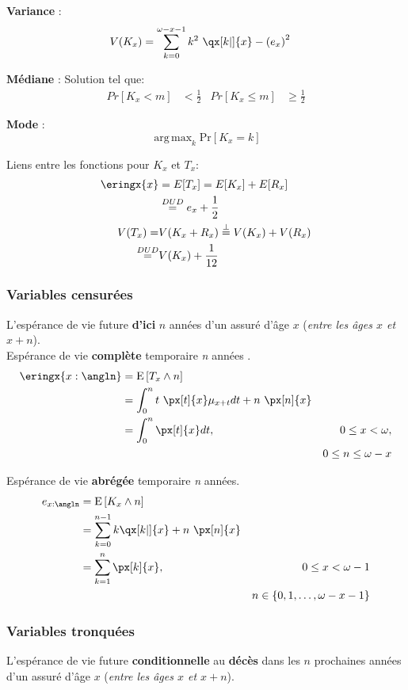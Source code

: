 \documentclass[10pt, french]{article}
\DeclareMathOperator*{\argmax}{arg\,max}
\begin{document}
\begin{multicols*}{3}
\textbf{Variance} :  
	\begin{align*}
		V(K_x) &= 
		\sum_{k = 0}^{\omega - x - 1} k^2 \ \qx[k | ]{x} - \left(e_{x}\right)^2 
	\end{align*}

\textbf{Médiane} : Solution tel que:
	\begin{align*}
		Pr[K_x < m] &< \frac{1}{2} &
		Pr[K_x \leq m] &\geq \frac{1}{2} 
	\end{align*}

\textbf{Mode} : 
	\[ \argmax_k \text{Pr}[K_x = k] \]


Liens entre les fonctions pour $K_x$ et $T_x$:\\
\begin{align*}
	\eringx{x} &= E[T_x] = E[K_x] + E[R_x] \\
	&\stackrel{DUD}= e_x + \frac{1}{2} \\
	V(T_x) = &V(K_x + R_x) \stackrel{\bot}= V(K_x) + V(R_x) \\
	\stackrel{DUD}= &V(K_x) + \frac{1}{12} 
\end{align*}

\subsubsection*{Variables censurées}
L'espérance de vie future \textbf{d'ici} $n$ années d'un assuré d'âge $x$ (\textit{entre les âges $x$ et $x+n$}).\\

Espérance de vie \textbf{complète} temporaire \textit{n} années .
\begin{align*}
\eringx{x:\angln} &= \esp{T_x \wedge n} \\
&= \int_0^{n}t \ \px[t]{x} \mu_{x + t} dt + n \ \px[n]{x} \\
&= \int_0^{n} \px[t]{x} dt, & 0 \leq x < \omega, \\
&& 0 \leq n \leq \omega - x 
\end{align*}

Espérance de vie \textbf{abrégée} temporaire \textit{n} années.
\begin{align*}
e_{x:\angln} &= \esp{K_x \wedge n} \\
&= \sum_{k = 0}^{n - 1} k \qx[k | ]{x} + n \ \px[n]{x} \\
&= \sum_{k = 1}^{n} \px[k]{x}, & 0 \leq x < \omega - 1 \\
&& n \in \{0, 1, \dots, \omega - x - 1\}
\end{align*}

\subsubsection*{Variables tronquées}
L'espérance de vie future \textbf{conditionnelle} au \textbf{décès} dans les $n$ prochaines années d'un assuré d'âge $x$ (\textit{entre les âges $x$ et $x+n$}).


\end{multicols*}
\end{document}
